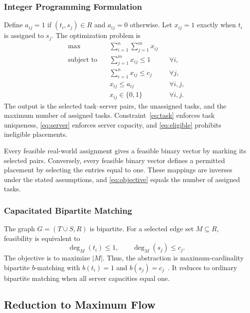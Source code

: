 \documentclass[conference]{IEEEtran}
\theoremstyle{definition}
\theoremstyle{remark}
\begin{document}
\subsubsection{Integer Programming Formulation}
Define $a_{ij}=1$ if $(t_i,s_j)\in R$ and $a_{ij}=0$ otherwise. Let
$x_{ij}=1$ exactly when $t_i$ is assigned to $s_j$. The optimization problem is
\begin{align}
\max\quad & \sum_{i=1}^{n}\sum_{j=1}^{m}x_{ij} \label{eq:objective}\\
\text{subject to}\quad
&\sum_{j=1}^{m}x_{ij}\leq1 &&\forall i, \label{eq:task}\\
&\sum_{i=1}^{n}x_{ij}\leq c_j &&\forall j, \label{eq:server}\\
&x_{ij}\leq a_{ij} &&\forall i,j, \label{eq:eligible}\\
&x_{ij}\in\{0,1\} &&\forall i,j. \label{eq:binary}
\end{align}
The output is the selected task--server pairs, the unassigned tasks, and the
maximum number of assigned tasks. Constraint~\eqref{eq:task} enforces task
uniqueness, \eqref{eq:server} enforces server capacity, and
\eqref{eq:eligible} prohibits ineligible placements.

Every feasible real-world assignment gives a feasible binary vector by
marking its selected pairs. Conversely, every feasible binary vector defines
a permitted placement by selecting the entries equal to one. These mappings
are inverses under the stated assumptions, and
\eqref{eq:objective} equals the number of assigned tasks.

\subsubsection{Capacitated Bipartite Matching}
The graph $G=(T\cup S,R)$ is bipartite. For a selected edge set $M\subseteq R$,
feasibility is equivalent to
\begin{equation}
\deg_M(t_i)\leq1,\qquad \deg_M(s_j)\leq c_j.
\end{equation}
The objective is to maximize $|M|$. Thus, the abstraction is maximum-cardinality
bipartite $b$-matching with $b(t_i)=1$ and $b(s_j)=c_j$~\cite{ahuja1993}.
It reduces to ordinary bipartite matching when all server capacities equal one.

\subsection{Reduction to Maximum Flow}
\end{document}
